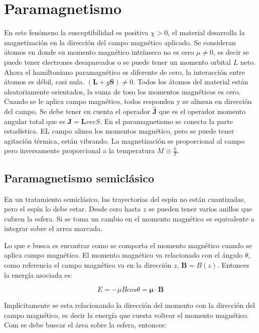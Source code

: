 \documentclass[11pt,fleqn]{book}
\renewcommand{\vec}[1]{\mathbf{#1}}
\begin{document}
\section{Paramagnetismo}

En este fenómeno la susceptibilidad es positiva $\chi>0$, el material desarrolla la magnetización en la dirección del campo magnético aplicado. Se consideran átomos en donde su momento magnético intrínseco no es cero $\mu\neq0$, es decir se puede tener electrones desapareados o se puede tener un momento orbital $L$ neto. Ahora el hamiltoniano paramagnético es diferente de cero, la interacción entre átomos es débil, casi nula. $(\vec{L}+g\vec{S})\neq0$. Todos los átomos del material están aleatoriamente orientados, la suma de toso los momentos magnéticos es cero. Cuando se le aplica campo magnético, todos responden y se alinean en dirección del campo. 
Se debe tener en cuenta el operador $\hat{\vec{J}}$ que es el operador momento angular total que es $\vec{J}=\vec{L}vec{S}$. En el paramagnetismo se conecta la parte estadística. EL campo alinea los momentos magnético, pero se puede tener agitación térmica, están vibrando. La magnetización es proporcional al campo pero inversamente proporcional a la temperatura $M\equiv\frac{b}{T}$.

\subsection{Paramagnetismo semiclásico}


En  un tratamiento semiclásico, las trayectorias del espín no están cuantizadas, pero el espín lo debe estar. Desde cero hasta $z$ se pueden tener varios anillos que cubren la esfera. Si se toma un cambio en el momento magnético es equivalente a integrar sobre el arrea marcada. 


Lo que e busca es encontrar como se comporta el momento magnético cuando se aplica campo magnético. El momento magnético va relacionado con el ángulo $\theta$, como referencia el campo magnético va en la dirección $z$, $\vec{B}=B(z)$. Entonces la energía asociada es:

\begin{equation}
    E=-\mu Bcos\theta=\vec{\mu}\cdot\vec{B}
    \label{Eq. 3.15}
\end{equation}

Implícitamente se esta relacionando la dirección del momento con la dirección del campo magnético, es decir la energía que cuesta voltear el momento magnético. Com se debe buscar el área sobre la esfera, entonces:
\end{document}
